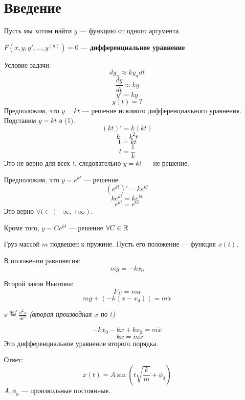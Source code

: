 

\cfoot{}

\setcounter{section}{-1}



\section{Введение}

Пусть мы хотим найти $y$ --- функцию от одного аргумента.

\begin{definition}
    $F(x, y, y', \ldots, y^{(n)}) = 0$ --- \textbf{дифференциальное уравнение}
\end{definition}

\begin{example}
    Условие задачи:
    $$d y_n \approx k y_n d t$$
    $$\frac{d y}{d t} \approx ky$$
    \begin{equation}
        y' = ky
    \end{equation}
    $$y(t) = ?$$
    Предположим, что $y=kt$ --- решение искомого дифференциального уравнения. Подставим $y=kt$ в (1).
    $$(kt)' = k (kt)$$
    $$k = k^2t$$
    $$1 = kt$$
    $$t = \frac{1}{k}$$
    Это не верно для всех $t$, следовательно $y=kt$ --- не решение.

    Предположим, что $y=e^{kt}$ --- решение.
    $$(e^{kt})' = ke^{kt}$$
    $$ke^{kt} = ke^{kt}$$
    $$e^{kt} = e^{kt}$$
    Это верно $\forall t \in (-\infty, +\infty)$.

    Кроме того, $y=Ce^{kt}$ --- решение $\forall C\in\mathbb{R}$
\end{example}

\begin{example}
    Груз массой $m$ подвешен к пружине. Пусть его положение --- функция $x(t)$.

    В положении равновесия:
    $$mg = -kx_0$$

    Второй закон Ньютона:
    $$F_\Sigma = ma$$
    $$mg + (-k(x-x_0))= m \ddot x$$
    \begin{remark}
        $\ddot x \stackrel{def}{=} \frac{d^2 x}{d t^2}$ \textit{(вторая производная $x$ по $t$)}
    \end{remark}
    $$-kx_0 - kx + kx_0 = m\ddot x$$
    $$-kx = m\ddot x$$
    Это дифференциальное уравнение второго порядка.

    Ответ: $$x(t) = A \sin\left(t\sqrt{\frac{k}{m}} + \phi_0\right)$$
    $A, \phi_0$ --- произвольные постоянные.
\end{example}

